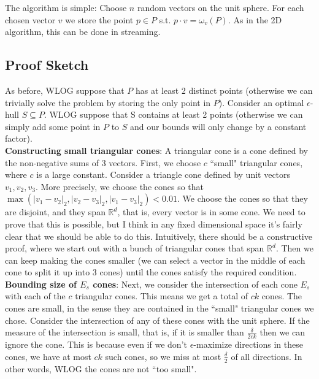 \documentclass[12pt]{article}
\theoremstyle{definition}
\theoremstyle{lemma}
\theoremstyle{theorem}
\begin{document}
The algorithm is simple: Choose $n$ random vectors on the unit sphere. For each chosen vector $v$ we store the point $p \in P$ s.t. $p \cdot v = \omega_v(P)$. As in the 2D algorithm, this can be done in streaming.

\subsection{Proof Sketch}

As before, WLOG suppose that $P$ has at least 2 distinct points (otherwise we can trivially solve the problem by storing the only point in $P$). Consider an optimal $\epsilon$-hull $S \subseteq P$. WLOG suppose that S contains at least 2 points (otherwise we can simply add some point in $P$ to $S$ and our bounds will only change by a constant factor). 
\\

\textbf{Constructing small triangular cones}: A triangular cone is a cone defined by the non-negative sums of 3 vectors. First, we choose $c$ ``small" triangular cones, where $c$ is a large constant. Consider a triangle cone defined by unit vectors $v_1, v_2, v_3$. More precisely, we choose the cones so that $\max(|v_1 - v_2|_2, |v_2 - v_3|_2, |v_1 - v_3|_2) < 0.01$. We choose the cones so that they are disjoint, and they span $\mathbb{R}^d$, that is, every vector is in some cone. We need to prove that this is possible, but I think in any fixed dimensional space it's fairly clear that we should be able to do this. Intuitively, there should be a constructive proof, where we start out with a bunch of triangular cones that span $\mathbb{R}^d$. Then we can keep making the cones smaller (we can select a vector in the middle of each cone to split it up into 3 cones) until the cones satisfy the required condition.
\\

\textbf{Bounding size of $E_s$ cones}: Next, we consider the intersection of each cone $E_s$ with each of the $c$ triangular cones. This means we get a total of $ck$ cones. The cones are small, in the sense they are contained in the ``small" triangular cones we chose. Consider the intersection of any of these cones with the unit sphere. If the measure of the intersection is small, that is, if it is smaller than $\frac{\delta}{2ck}$ then we can ignore the cone. This is because even if we don't $\epsilon$-maximize directions in these cones, we have at most $ck$ such cones, so we miss at most $\frac{\delta}{2}$ of all directions. In other words, WLOG the cones are not ``too small".
\\
\end{document}
